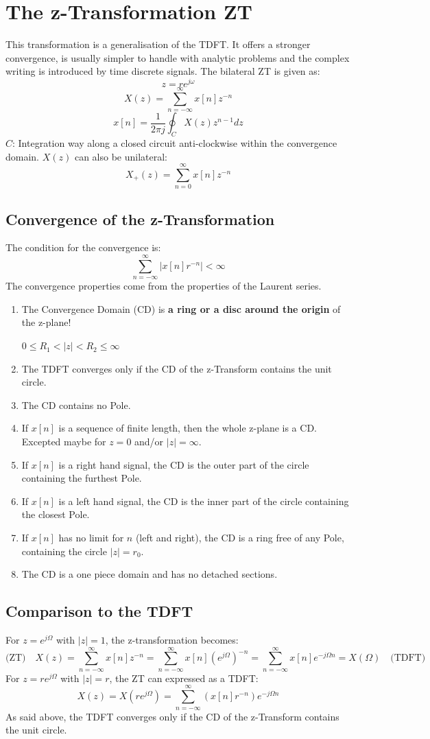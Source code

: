 \documentclass[10pt,a4paper]{article}
\begin{document}
\newpage
\section{The z-Transformation ZT}
This transformation is a generalisation of the TDFT. It offers a stronger convergence, is usually simpler to handle with analytic problems and the complex writing is introduced by time discrete signals.
The bilateral ZT is given as:
$$
z = re^{j\omega}
$$
$$
\boxed{
X(z) = \sum_{n=-\infty}^{\infty} x[n] z^{-n}
}
$$
$$
\boxed{
x[n] = \frac{1}{2\pi j} \oint_C X(z)z^{n-1} dz
}
$$
$C$: Integration way along a closed circuit anti-clockwise within the convergence domain.
$X(z)$ can also be unilateral: 
$$
X_+(z) = \sum_{n=0}^{\infty} x[n] z^{-n}
$$

\subsection{Convergence of the z-Transformation}
The condition for the convergence is:
$$
\sum_{n=-\infty}^{\infty} \vert x[n]r^{-n} \vert < \infty
$$
The convergence properties come from the properties of the Laurent series. 
\begin{enumerate}
\item The Convergence Domain (CD) is \textbf{a ring or a disc around the origin} of the z-plane!

$0 \leq R_1 < \vert z \vert < R_2 \leq \infty$
\item The TDFT converges only if the CD of the z-Transform contains the unit circle. 
\item The CD contains no Pole.
\item If $x[n]$ is a sequence of finite length, then the whole z-plane is a CD. Excepted maybe for $z = 0$ and/or $\vert z \vert = \infty$.
\item If $x[n]$ is a right hand signal, the CD is the outer part of the circle containing the furthest Pole. 
\item If $x[n]$ is a left hand signal, the CD is the inner part of the circle containing the closest Pole. 
\item If $x[n]$ has no limit for $n$ (left and right), the CD is a ring free of any Pole, containing the circle $\vert z \vert = r_0$.
\item The CD is a one piece domain and has no detached sections. 
\end{enumerate}

\subsection{Comparison to the TDFT}
For $z = e^{j\Omega}$ with $\vert z \vert = 1$, the z-transformation becomes:
$$
\text{(ZT)} \quad
X(z) = \sum_{n=-\infty}^{\infty} x[n] z^{-n}
	 = \sum_{n=-\infty}^{\infty} x[n] (e^{j\Omega})^{-n} 
	 = \sum_{n=-\infty}^{\infty} x[n] e^{-j\Omega n} 
	 = X(\Omega) \quad \text{(TDFT)}
$$
For $z = re^{j\Omega}$ with $\vert z \vert = r$, the ZT can expressed as a TDFT:
$$
X(z) = X(re^{j\Omega}) = \sum_{n=-\infty}^{\infty} (x[n]r^{-n}) e^{-j\Omega n}
$$
As said above, the TDFT converges only if the CD of the z-Transform contains the unit circle.
\end{document}
